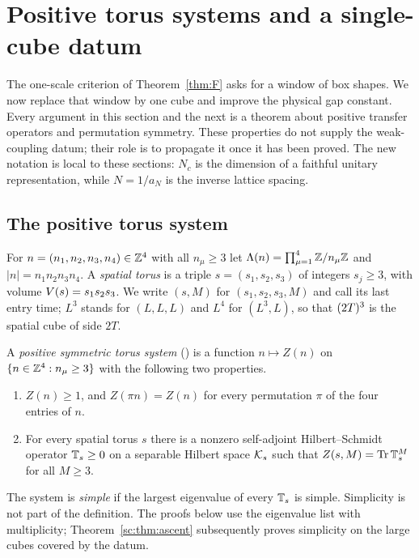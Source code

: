 \section{Positive torus systems and a single-cube datum}\label{sc:sec:psts}

The one-scale criterion of Theorem~\ref{thm:F} asks for a window of box shapes.
We now replace that window by one cube and improve the physical gap constant.
Every argument in this section and the next is a theorem about positive transfer
operators and permutation symmetry. These properties do not supply the
weak-coupling datum; their role is to propagate it once it has been proved.
The new notation is local to these sections: $N_c$ is the dimension of a faithful
unitary representation, while $N=1/a_N$ is the inverse lattice spacing.

\subsection{The positive torus system}
For $n=(n_1,n_2,n_3,n_4)\in\mathbb{Z}^4$ with all $n_\mu\ge3$ let $\Lambda(n)=\prod_{\mu=1}^4\mathbb{Z}/n_\mu\mathbb{Z}$ and $|n|=n_1n_2n_3n_4$. A \emph{spatial torus} is a triple $s=(s_1,s_2,s_3)$ of integers $s_j\ge3$, with volume $V(s)=s_1s_2s_3$. We write $(s,M)$ for $(s_1,s_2,s_3,M)$ and call its last entry time; $L^3$ stands for $(L,L,L)$ and $L^4$ for $(L^3,L)$, so that $(2T)^3$ is the spatial cube of side $2T$.

A \emph{positive symmetric torus system} (\PSTS) is a function $n\mapsto Z(n)$ on $\{n\in\mathbb{Z}^4:n_\mu\ge3\}$ with the following two properties.
\begin{enumerate}[label=(P\arabic*),leftmargin=3em]
\item $Z(n)\ge1$, and $Z(\pi n)=Z(n)$ for every permutation $\pi$ of the four entries of $n$.
\item For every spatial torus $s$ there is a nonzero self-adjoint Hilbert--Schmidt operator $\mathbb T_s\ge0$ on a separable Hilbert space $\mathcal K_s$ such that $Z(s,M)=\operatorname{Tr}\mathbb T_s^M$ for all $M\ge3$.
\end{enumerate}
The system is \emph{simple} if the largest eigenvalue of every $\mathbb T_s$ is simple. Simplicity is not part of the definition. The proofs below use the eigenvalue list with multiplicity; Theorem~\ref{sc:thm:ascent} subsequently proves simplicity on the large cubes covered by the datum.

